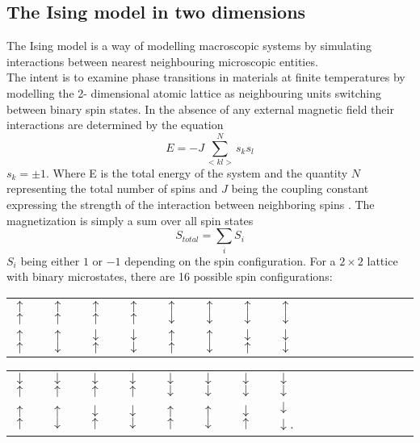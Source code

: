 \documentclass[10pt,a4paper]{article}
\begin{document}
\subsection{The Ising model in two dimensions}
The Ising model is a way of modelling macroscopic systems by simulating interactions between nearest neighbouring microscopic entities.\\The intent is to examine phase transitions in materials at finite temperatures by modelling the 2- dimensional atomic lattice as neighbouring units switching between  binary spin states. In the absence of any external magnetic field their interactions are determined by the equation
\begin{equation} \label{2d-ising energy}
E=-J\sum_{< kl >}^{N}s_ks_l 
\end{equation}
$s_k=\pm 1$. Where E is the total energy of the system and the quantity $N$ representing the total number of spins and $J$ being the coupling constant expressing the strength of the interaction between
neighboring spins \cite{Lecture_Notes_Fall_2015}. The magnetization is simply a sum over all spin states
\begin{equation}
S_{total} = \sum_{i} S_i
\end{equation}
$S_i$ being either $1$ or $-1$ depending on the spin configuration.
For a $2\times2$ lattice with binary microstates, there are 16 possible spin configurations:
\begin{table}[H]
\begin{tabular}{llllllllllllllll}
 $\uparrow$ $\uparrow$ &  $\uparrow$ $\uparrow$ &  $\uparrow$ $\uparrow$ &  $\uparrow$ $\uparrow$ &  $\uparrow$ $\downarrow$ &  $\uparrow$ $\downarrow$ & $\uparrow$ $\downarrow$ & $\uparrow$ $\downarrow$ \\
 $\uparrow$ $\uparrow$&  $\uparrow$ $\downarrow$ &  $\downarrow$ $\uparrow$ &  $\downarrow$ $\downarrow$ &  $\uparrow$ $\uparrow$ &  $\uparrow$ $\downarrow$ &  $\downarrow$ $\uparrow$ &  $\downarrow$ $\downarrow$
\end{tabular}
\end{table}
\begin{table}[H]
\begin{tabular}{llllllllllllllll}
 $\downarrow$ $\uparrow$ & $\downarrow$ $\uparrow$ & $\downarrow$ $\uparrow$ & $\downarrow$ $\uparrow$ & $\downarrow$ $\downarrow$ & $\downarrow$ $\downarrow$ &  $\downarrow$ $\downarrow$ & $\downarrow$ $\downarrow$ \\
 $\uparrow$ $\uparrow$ & $\uparrow$ $\downarrow$ & $\downarrow$ $\uparrow$ & $\downarrow$ $\downarrow$ & $\uparrow$ $\uparrow$ & $\uparrow$ $\downarrow$ & $\downarrow$ $\uparrow$ & $\downarrow$ $\downarrow$.
\end{tabular}
\end{table}
\end{document}
